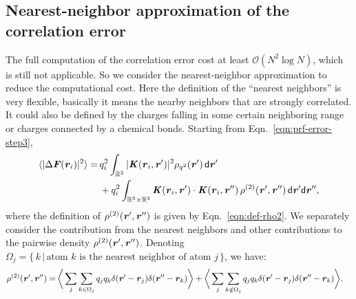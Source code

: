 \documentclass[aps,pre,preprint]{revtex4}
\renewcommand{\v}[1]{\textbf{\textit{#1}}}
\renewcommand{\d}[1]{\textsf{#1}}
\begin{document}
\subsection{Nearest-neighbor approximation of the correlation
error}
The full computation of the correlation error cost at least $\mathcal
O(N^2\log N)$, which is still not applicable.
So we consider the nearest-neighbor approximation to reduce
the computational cost.
Here the definition of the ``nearest neighbors'' is
very flexible, basically it means the nearby neighbors that are
strongly correlated. It could also be defined by the charges falling in some
certain neighboring range or charges connected by a chemical bonds.
Starting from Eqn.~\eqref{eqn:prf-error-step3},
\begin{align} \nonumber
  \langle\vert\Delta\v F(\v r_i)\vert^2\rangle
  =\,&
  q_i^2\int_{\mathbb R^3}
  \vert\v K(\v r_i , \v r')\vert^2\rho_{q^2}(\v r')\,\d d\v r'
  \\
  & +
  q_i^2\int_{\mathbb R^3\times\mathbb R^3}
  \v K(\v r_i , \v r')\cdot\v K(\v r_i , \v r'')\,
  \rho^{(2)}(\v r', \v r'')
  \,\d d\v r'\d d\v r'',
\end{align}
where the definition of $\rho^{(2)}(\v r', \v r'')$ is given by
Eqn.~\eqref{eqn:def-rho2}.
We separately consider the  contribution from the nearest neighbors
and other contributions to
the pairwise density $\rho^{(2)}(\v r', \v r'')$.  Denoting
$\Omega_j = \{ \,k\,\vert\,
\textrm{atom $k$ is the nearest neighbor of atom $j$} \,\}$,
we have:
\begin{align}\label{eqn:split-rho-q2}
  \rho^{(2)}(\v r', \v r'')
  = &\,
  \bigg\langle
  \sum_j\sum_{k\in\Omega_j}q_j q_k\delta(\v r' - \v r_j)\delta(\v r'' - \v r_k)
  \bigg\rangle
  +
  \bigg\langle
  \sum_j\sum_{k\notin\Omega_j}q_j q_k\delta(\v r' - \v r_j)\delta(\v r'' - \v r_k)
  \bigg\rangle.
\end{align}
\end{document}
